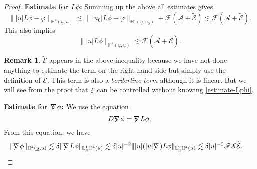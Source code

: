 \documentclass[11pt,reqno]{amsart}
\theoremstyle{definition}
\newtheorem{remark}{Remark}[section]
\numberwithin{equation}{section}
\renewcommand{\L}{\mathbb{L}}
\renewcommand{\H}{\mathbb{H}}
\def\ub{\underline{u}}
\def\nablas{\mbox{$\nabla \mkern -13mu /$ }}
\begin{document}
\begin{proof}  {\bf \underline{Estimate for $L\phi$}:}
 Summing up the above all estimates gives
\begin{equation*}\||u|L\phi-\varphi\|_{\H^4(\ub,u)}\lesssim \||u_0|L\phi-\varphi\|_{\H^4(\ub,u_0)}+\mathscr{F}(\mathcal{A}+\widetilde{\mathcal{E}})\lesssim \mathscr{F}(\mathcal{A}+\widetilde{\mathcal{E}}).\end{equation*}
This also implies
\begin{equation}\label{estimate-Lphi}\||u|L\phi\|_{\H^4(\ub,u)}\lesssim \mathscr{F}(\mathcal{A}+\widetilde{\mathcal{E}}).\end{equation}
\begin{remark} $\widetilde{\mathcal{E}}$ appears in the above inequality because we have not done anything to estimate the  term on the right hand side but simply use the definition of $\widetilde{\mathcal{E}}$. This term is also a \emph{borderline term} although it is linear. But we will see from the proof that $\widetilde{\mathcal{E}}$ can be controlled without knowing \eqref{estimate-Lphi}. 
\end{remark}
{\bf \underline{Estimate for $\nablas\phi$}:} We use the equation \begin{equation}\label{equ-Dnablasphi}
D\nablas\phi=\nablas L\phi.
\end{equation} 
From this equation, we have
\begin{equation}\label{estimate-nablasphi}
\begin{split}
\|\nablas\phi\|_{\H^4(\ub,u)}&\lesssim\delta \|\nablas L\phi\|_{\L^1_{\ub}\H^4(u)}\lesssim  \delta|u|^{-2}\||u|(|u|\nablas)L\phi\|_{\L_{\ub}^2\H^4(u)}\lesssim\delta|u|^{-2}\mathscr{F}\mathscr{E}\widetilde{\mathcal{E}}.
\end{split}
\end{equation}


\end{proof}
\end{document}
